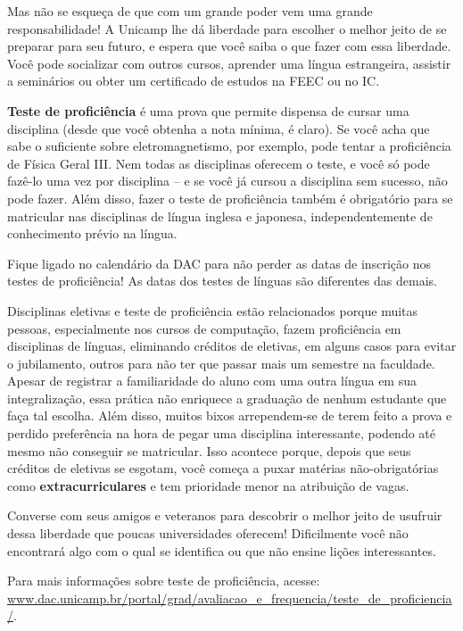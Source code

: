 Mas não se esqueça de que com um grande poder vem uma grande responsabilidade!
A Unicamp lhe dá liberdade para escolher o melhor jeito de se preparar para seu
futuro, e espera que você saiba o que fazer com essa liberdade. Você pode socializar com
outros cursos, aprender uma língua estrangeira, assistir a seminários ou obter
um certificado de estudos na FEEC ou no IC.

\textbf{Teste de proficiência} é uma prova que permite dispensa de cursar uma disciplina
(desde que você obtenha a nota mínima, é claro). Se você acha que sabe o suficiente
sobre eletromagnetismo, por exemplo, pode tentar a proficiência de Física Geral III.
Nem todas as disciplinas oferecem o teste, e você só pode fazê-lo uma vez por
disciplina -- e se você já cursou a disciplina sem sucesso, não pode fazer.
Além disso, fazer o teste de proficiência também é obrigatório para se matricular
nas disciplinas de língua inglesa e japonesa, independentemente de conhecimento
prévio na língua.

Fique ligado no calendário da DAC para não perder as datas de inscrição nos
testes de proficiência! As datas dos testes de línguas são
diferentes das demais.

Disciplinas eletivas e teste de proficiência estão relacionados porque muitas pessoas,
especialmente nos cursos de computação, fazem proficiência em
disciplinas de línguas, eliminando créditos de eletivas, em alguns casos para evitar o jubilamento, outros para não ter que
passar mais um semestre na faculdade. Apesar de registrar a familiaridade do
aluno com uma outra língua em sua integralização, essa prática não enriquece
a graduação de nenhum estudante que faça tal escolha. Além disso, muitos bixos
arrependem-se de terem feito a prova e perdido preferência na hora de pegar uma
disciplina interessante, podendo até mesmo não conseguir se matricular. Isso acontece
porque, depois que seus créditos de eletivas se esgotam, você começa a puxar matérias
não-obrigatórias como \textbf{extracurriculares} e tem prioridade menor na
atribuição de vagas.

Converse com seus amigos e veteranos para descobrir o melhor jeito de usufruir
dessa liberdade que poucas universidades oferecem! Dificilmente você não
encontrará algo com o qual se identifica ou que não ensine lições interessantes.

Para mais informações sobre teste de proficiência, acesse:
\url{www.dac.unicamp.br/portal/grad/avaliacao_e_frequencia/teste_de_proficiencia/}.

\newpage
